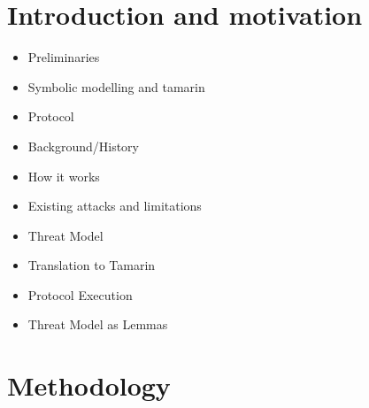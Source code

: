 \documentclass[journal]{IEEEtran}
\begin{document}
\section{Introduction and motivation}
\begin{itemize}
\item Preliminaries
\item 	Symbolic modelling and tamarin
\item Protocol
\item 	Background/History
\item 	How it works
\item 	Existing attacks and limitations
\item Threat Model
\item Translation to Tamarin
\item 	Protocol Execution
\item 	Threat Model as Lemmas
\end{itemize}




\section{Methodology}
\end{document}

